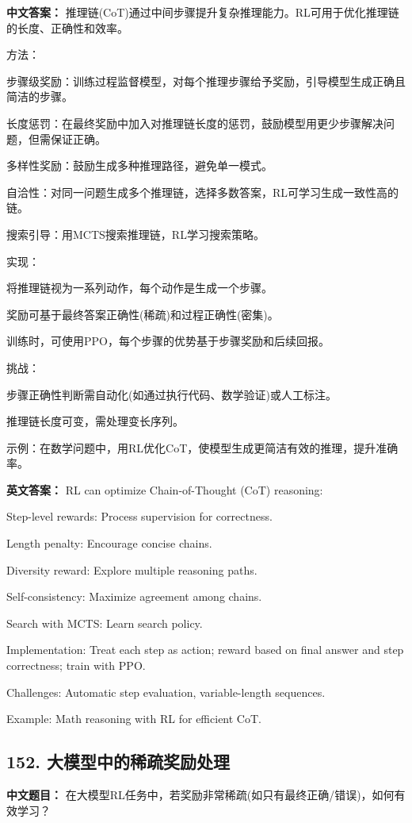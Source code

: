 \documentclass[10pt,a4paper]{ctexart}
\begin{document}
\textbf{中文答案：}
推理链(CoT)通过中间步骤提升复杂推理能力。RL可用于优化推理链的长度、正确性和效率。

方法：

步骤级奖励：训练过程监督模型，对每个推理步骤给予奖励，引导模型生成正确且简洁的步骤。

长度惩罚：在最终奖励中加入对推理链长度的惩罚，鼓励模型用更少步骤解决问题，但需保证正确。

多样性奖励：鼓励生成多种推理路径，避免单一模式。

自洽性：对同一问题生成多个推理链，选择多数答案，RL可学习生成一致性高的链。

搜索引导：用MCTS搜索推理链，RL学习搜索策略。

实现：

将推理链视为一系列动作，每个动作是生成一个步骤。

奖励可基于最终答案正确性(稀疏)和过程正确性(密集)。

训练时，可使用PPO，每个步骤的优势基于步骤奖励和后续回报。

挑战：

步骤正确性判断需自动化(如通过执行代码、数学验证)或人工标注。

推理链长度可变，需处理变长序列。

示例：在数学问题中，用RL优化CoT，使模型生成更简洁有效的推理，提升准确率。

\textbf{英文答案：}
RL can optimize Chain-of-Thought (CoT) reasoning:

Step-level rewards: Process supervision for correctness.

Length penalty: Encourage concise chains.

Diversity reward: Explore multiple reasoning paths.

Self-consistency: Maximize agreement among chains.

Search with MCTS: Learn search policy.

Implementation: Treat each step as action; reward based on final answer and step correctness; train with PPO.

Challenges: Automatic step evaluation, variable-length sequences.

Example: Math reasoning with RL for efficient CoT.

\subsection*{152. 大模型中的稀疏奖励处理}
\textbf{中文题目：} 在大模型RL任务中，若奖励非常稀疏(如只有最终正确/错误)，如何有效学习？
\end{document}
